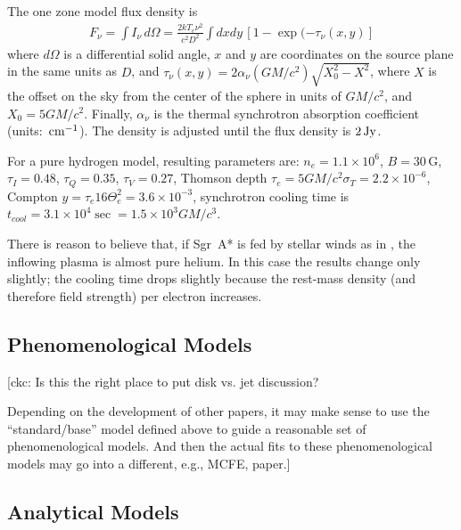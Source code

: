 \documentclass[twocolumn,tighten,dvipsnames]{aastex63}
\newcommand\sgra{Sgr~A*\xspace}
\newcommand\mbh{{M}} %
\newcommand\Jy{{\rm \, Jy}}
\newcommand\cm{{\rm \, cm}}
\newcommand\<{{\langle}}
\renewcommand\>{{\rangle}} %
\newcommand\ckc[1]{{\color{MidnightBlue}[ckc: #1]}}
\begin{document}
The one zone model flux density is
\begin{align}
  F_\nu = \int I_\nu \, d\Omega =
  \frac{2 k T_e \nu^2}{c^2 D^2} \int dx dy\,\left[1 - \exp(-\tau_\nu(x,y)\right]
\end{align}
where $d\Omega$ is a differential solid angle, $x$ and $y$ are
coordinates on the source plane in the same units as $D$, and
$\tau_\nu(x,y) = 2 \alpha_\nu (G\mbh/c^2) \sqrt{X_0^2 - X^2}$,
where $X$ is the offset on the sky from the center of the sphere in
units of
$GM/c^2$, and $X_0 = 5 G\mbh/c^2$.
Finally, $\alpha_\nu$ is the thermal synchrotron absorption
coefficient (units: $\cm^{-1}$).
The density is adjusted until the flux density is $2\Jy$.

For a pure hydrogen model, resulting parameters are: $n_e = 1.1 \times
10^6$, $B = 30\,\mathrm{G}$, $\tau_I = 0.48$, $\tau_Q = 0.35 $,
$\tau_V = 0.27$, Thomson depth $\tau_e = 5 G\mbh/c^2 \sigma_T = 2.2
\times 10^{-6}$, Compton $y = \tau_e 16 \Theta_e^2 = 3.6 \times
10^{-3}$, synchrotron cooling time is $t_{cool} = 3.1 \times 10^4\sec
= 1.5 \times 10^3 G\mbh/c^3$.

There is reason to believe that, if \sgra is fed by stellar winds as
in \citet{2019MNRAS.482L.123R}, the inflowing plasma is almost pure
helium.
In this case the results change only slightly; the cooling time drops
slightly because the rest-mass density (and therefore field strength)
per electron increases.

\subsection{Phenomenological Models}
\label{sec:phenomodels}

\ckc{Is this the right place to put disk vs. jet discussion?

  Depending on the development of other papers, it may make sense
  to use the ``standard/base'' model defined above to guide a
  reasonable set of phenomenological models.
  And then the actual fits to these phenomenological models may go
  into a different, e.g., MCFE, paper.}

\subsection{Analytical Models}
\label{sec:anamodels}
\end{document}
